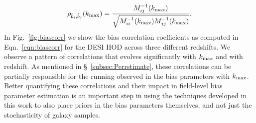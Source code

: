 \documentclass[fleqn,usenatbib]{mnras}
\newcommand{\kmax}{k_{\rm max}}
\begin{document}
\begin{align}
    \label{eqn:biascorr}
    \rho_{\hat{b}_i, \hat{b}_j}(\kmax) = \frac{M_{ij}^{-1}(\kmax)}{\sqrt{M_{ii}^{-1} (\kmax)M_{jj}^{-1}(\kmax)}}.
\end{align}
In Fig.~\ref{fig:biascorr} we show the bias correlation coefficients as computed in Eqn.~\ref{eqn:biascorr} for the DESI HOD across three different redshifts. We observe a pattern of correlations that evolves significantly with $\kmax$ and with redshift. As mentioned in \S~\ref{subsec:Perrstimate}, these correlations can be partially responsible for the running observed in the bias parameters with $k_{\rm max}$. Better quantifying these correlations and their impact in field-level bias parameter estimation is an important step in using the techniques developed in this work to also place priors in the bias parameters themselves, and not just the stochasticity of galaxy samples.
\end{document}
